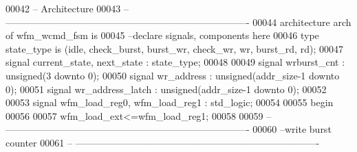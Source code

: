 \begin{DoxyCode}
00042 \textcolor{keyword}{-- Architecture}
00043 \textcolor{keyword}{-- ----------------------------------------------------------------------------}
00044 \textcolor{keywordflow}{architecture} arch \textcolor{keywordflow}{of} wfm_wcmd_fsm is
00045 \textcolor{keyword}{--declare signals,  components here}
00046 \textcolor{keywordflow}{type} \textcolor{vhdlchar}{state_type} \textcolor{keywordflow}{is} \textcolor{vhdlchar}{(}\textcolor{vhdlchar}{idle}\textcolor{vhdlchar}{,} \textcolor{vhdlchar}{check\_burst}\textcolor{vhdlchar}{,} \textcolor{vhdlchar}{burst\_wr}\textcolor{vhdlchar}{,} \textcolor{vhdlchar}{check\_wr}\textcolor{vhdlchar}{,} \textcolor{vhdlchar}{wr}\textcolor{vhdlchar}{,} \textcolor{vhdlchar}{burst\_rd}\textcolor{vhdlchar}{,} \textcolor{vhdlchar}{rd}\textcolor{vhdlchar}{)};
00047 \textcolor{keywordflow}{signal} \textcolor{vhdlchar}{current_state}\textcolor{vhdlchar}{,} \textcolor{vhdlchar}{next_state} \textcolor{vhdlchar}{:} \textcolor{vhdlchar}{state_type};
00048 
00049 \textcolor{keywordflow}{signal} \textcolor{vhdlchar}{wrburst_cnt}          \textcolor{vhdlchar}{:} \textcolor{comment}{unsigned}\textcolor{vhdlchar}{(}\textcolor{vhdllogic}{}\textcolor{vhdllogic}{3} \textcolor{keywordflow}{downto} \textcolor{vhdllogic}{}\textcolor{vhdllogic}{0}\textcolor{vhdlchar}{)};
00050 \textcolor{keywordflow}{signal} \textcolor{vhdlchar}{wr_address}               \textcolor{vhdlchar}{:} \textcolor{comment}{unsigned}\textcolor{vhdlchar}{(}\textcolor{vhdlchar}{addr_size}\textcolor{vhdlchar}{-}\textcolor{vhdllogic}{}\textcolor{vhdllogic}{1} \textcolor{keywordflow}{downto} \textcolor{vhdllogic}{}\textcolor{vhdllogic}{0}\textcolor{vhdlchar}{)};
00051 \textcolor{keywordflow}{signal} \textcolor{vhdlchar}{wr_address_latch}     \textcolor{vhdlchar}{:} \textcolor{comment}{unsigned}\textcolor{vhdlchar}{(}\textcolor{vhdlchar}{addr_size}\textcolor{vhdlchar}{-}\textcolor{vhdllogic}{}\textcolor{vhdllogic}{1} \textcolor{keywordflow}{downto} \textcolor{vhdllogic}{}\textcolor{vhdllogic}{0}\textcolor{vhdlchar}{)};
00052 
00053 \textcolor{keywordflow}{signal} \textcolor{vhdlchar}{wfm_load_reg0}\textcolor{vhdlchar}{,} \textcolor{vhdlchar}{wfm_load_reg1} \textcolor{vhdlchar}{:} \textcolor{comment}{std\_logic};
00054   
00055 \textcolor{vhdlkeyword}{begin}
00056 
00057 \textcolor{vhdlchar}{wfm_load_ext}\textcolor{vhdlchar}{<=}\textcolor{vhdlchar}{wfm_load_reg1};
00058 
00059 \textcolor{keyword}{-- ----------------------------------------------------------------------------}
00060 \textcolor{keyword}{--write burst counter}
00061 \textcolor{keyword}{-- ----------------------------------------------------------------------------}

\end{DoxyCode}
